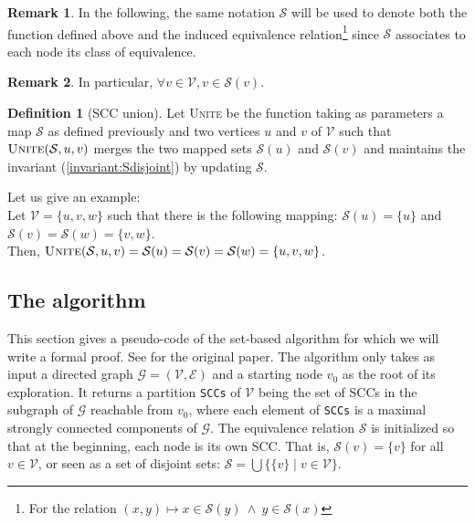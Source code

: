 \documentclass[a4 paper, 12pt]{article}
\theoremstyle{definition}
\def\GG{\ensuremath{\mathcal{G}}}
\def\VV{\ensuremath{\mathcal{V}}}
\def\EE{\ensuremath{\mathcal{E}}}
\newtheorem{definition}{Definition}
\newtheorem{remark}{Remark}
\begin{document}
\begin{remark}
    In the following, the same notation $\mathcal{S}$ will be used to denote both the function defined above and the induced equivalence relation\footnote{For the relation $(x, y) \mapsto x \in \mathcal{S}(y) ~\land~ y \in \mathcal{S}(x) $} since $\mathcal{S}$ associates to each node its class of equivalence. 
\end{remark}

\begin{remark}
    In particular, $\forall v \in \mathcal{V}, v \in \mathcal{S}(v)$.
\end{remark}

\begin{definition}[SCC union]
    Let \textsc{Unite} be the function taking as parameters a map $\mathcal{S}$ as defined previously and two vertices $u$ and $v$ of $\mathcal{V}$ such that $\textsc{Unite}(\mathcal{S}, u, v)$ merges the two mapped sets $\mathcal{S}(u)$ and $\mathcal{S}(v)$ and maintains the invariant (\ref{invariant:Sdisjoint}) by updating $\mathcal{S}$.
\end{definition}
Let us give an example:\\
Let $\mathcal{V} = \{u,v,w\}$ such that there is the following mapping: $\mathcal{S}(u) = \{u\}$ and $\mathcal{S}(v) = \mathcal{S}(w) = \{v,w\}$.\\
Then, $\textsc{Unite}(\mathcal{S}, u, v) = \mathcal{S}(u) = \mathcal{S}(v) = \mathcal{S}(w) = \{u,v,w\}$.  

\subsection{The algorithm}
This section gives a pseudo-code of the set-based algorithm for which we will write a formal proof. See \cite{bloemen_strong_2019} for the original paper.
\BlankLine
The algorithm only takes as input a directed graph $\GG = (\VV, \EE)$ and a starting node $v_0$ as the root of its exploration. It returns a partition \texttt{SCCs} of \VV \xspace being the set of SCCs in the subgraph of \GG\xspace reachable from $v_0$, where each element of \texttt{SCCs} is a maximal strongly connected components of \GG. The equivalence relation $\mathcal{S}$ is initialized so that at the beginning, each node is its own SCC. That is, $\mathcal{S}(v) = \{v\}$ for all $v \in \VV$, or seen as a set of disjoint sets: $\mathcal{S} = \bigcup \{ \{v\} \mid v \in \VV \}$.\\
\BlankLine
\end{document}
